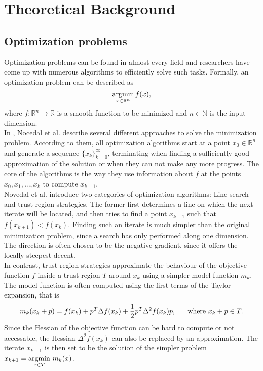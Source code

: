 \label{section:theoreticalBackground}
\section{Theoretical Background}
\subsection{Optimization problems}
Optimization problems can be found in almost every field and researchers have come up with numerous algorithms to efficiently solve such tasks. Formally, an optimization problem can be described as 
\[\operatorname*{argmin}_{x \in \mathbb{R}^n} f(x),\]
where $f\colon \mathbb{R}^n\to \mathbb{R}$ is a smooth function to be minimized and $n \in \mathbb{N}$ is the input dimension.\\
In \cite{NoceWrig06}, Nocedal et al. describe several different approaches to solve the minimization problem. According to them, all optimization algorithms start at a point $x_0 \in \mathbb{R}^n$ and generate a sequence $\{x_k\}_{k=0}^\infty$, terminating when finding a sufficiently good approximation of the solution or when they can not make any more progress. The core of the algorithms is the way they use information about $f$ at the points $x_0, x_1, ..., x_k$ to compute $x_{k+1}$. \\
\indent Novedal et al. introduce two categories of optimization algorithms: Line search and trust region strategies. The former first determines a line on which the next iterate will be located, and then tries to find a point $x_{k+1}$ such that $f(x_{k+1}) < f(x_k)$. Finding such an iterate is much simpler than the original minimization problem, since a search has only performed along one dimension. The direction is often chosen to be the negative gradient, since it offers the locally steepest decent. 
\\ \indent In contrast, trust region strategies approximate the behaviour of the objective function $f$ inside a trust region $T$ around $x_k$ using a simpler model function $m_k$. The model function is often computed using the first terms of the Taylor expansion, that is \[m_k(x_k + p) = f(x_k) + p^T\Delta f(x_k) + \frac{1}{2}p^T\Delta^2 f(x_k) p \text{, \indent where } x_k + p \in T.\] Since the Hessian of the objective function can be hard to compute or not accessable, the Hessian $\Delta^2 f(x_k)$ can also be replaced by an approximation. The iterate $x_{k+1}$ is then set to be the solution of the simpler problem $x_{k+1} = \underset{x \in T}{\operatorname*{argmin} }  \,\,m_k(x)$.

